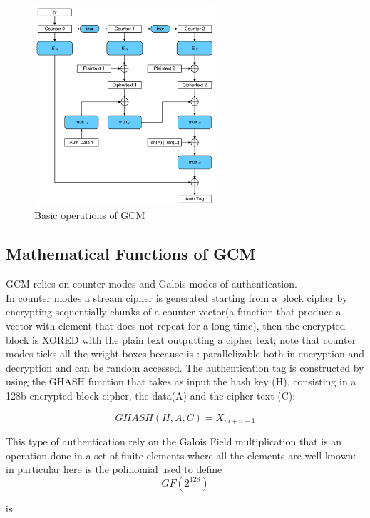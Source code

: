 \documentclass{article}
\begin{document}
	\begin{figure}[h]
		\includegraphics[width=0.6\textwidth ]{images/GCM.png}
		\centering
		\caption{Basic operations of GCM}
	\end{figure}

\clearpage
\subsection{Mathematical Functions of GCM}\label{sec:mathgcm}

GCM relies on counter modes and Galois modes of authentication.\\
In counter modes a stream cipher is generated starting from a block cipher by encrypting sequentially chunks of a counter vector(a function that produce a vector with element that does not repeat for a long time), then the encrypted block is XORED with the plain text outputting a cipher text; note that counter modes ticks all the wright boxes because is : parallelizable both in encryption and decryption and can be random accessed.
The authentication tag is constructed by using the GHASH function that takes as input the hash key (H), consisting in a 128b encrypted block cipher, the data(A) and the cipher text (C):


\begin{center}
\[{{GHASH}}(H,A,C)=X_{m+n+1}\] 
\end{center}
 
 This type of authentication rely on the Galois Field multiplication that is an operation done in a set of finite elements where all the elements are well known: in particular here is the polinomial used to define 
\[{GF(2^{128} ) }\] 

\begin{center}
 is:  
 \end{center}
 
\end{document}
